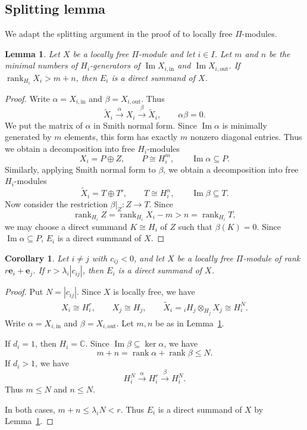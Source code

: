 \documentclass[12pt,reqno]{amsart}
\numberwithin{equation}{section}
\newtheorem{lemma}[theorem]{Lemma}
\newtheorem{corollary}[theorem]{Corollary}
\theoremstyle{definition}
\theoremstyle{remark}
\renewcommand{\Im}{\operatorname{Im}}
\newcommand{\rank}{\operatorname{rank}}
\theoremstyle{plain}
\theoremstyle{plain}
\begin{document}
\subsection{Splitting lemma}\label{subsec:splitting}
We adapt the splitting argument in the proof of \cite[Lemma~6.3]{GLS18} to locally free $\Pi$-modules.
\begin{lemma}\label{lem:general splitting}
   Let $X$ be a locally free $\Pi$-module and let $i\in I$. Let $m$ and $n$ be the minimal numbers of $H_i$-generators of $\Im X_{i,\mathrm{in}}$ and $\Im X_{i,\mathrm{out}}$. If $\rank_{H_i}X_i>m+n$, then $E_i$ is a direct summand of $X$.
\end{lemma}

\begin{proof}
    Write $\alpha=X_{i,\mathrm{in}}$ and $\beta=X_{i,\mathrm{out}}$. Thus
\[
    \widetilde X_i \xrightarrow{\alpha} X_i
    \xrightarrow{\beta} \widetilde X_i,
    \qquad \alpha\beta=0.
\]
We put the matrix of $\alpha$ in Smith normal form. Since $\Im \alpha$ is minimally generated by $m$ elements, this form has exactly $m$ nonzero diagonal entries. Thus we obtain a decomposition into free $H_i$-modules
\[
    X_i=P\oplus Z,\qquad
    P\cong H_i^m,\qquad
    \Im \alpha\subseteq P.
\]
Similarly, applying Smith normal form to $\beta$, we obtain a decomposition into free $H_i$-modules
\[
    \widetilde X_i=T\oplus T',\qquad
    T\cong H_i^n,\qquad
    \Im \beta\subseteq T.
\]
Now consider the restriction $\beta|_Z:Z\to T$. Since
\[
    \rank_{H_i}Z
    =\rank_{H_i}X_i-m>n=\rank_{H_i}T,
\]
we may choose a direct summand $K\cong H_i$ of $Z$ such that $\beta(K)=0$. Since $\Im \alpha\subseteq P$, $E_i$ is a direct summand of $X$.
\end{proof}

\begin{corollary}\label{lem:splitting}
Let $i\ne j$ with $c_{ij}<0$, and let $X$ be a locally free $\Pi$-module of rank $r\mathbf e_i+\mathbf e_j$. If $r>\lambda_i|c_{ij}|$, then $E_i$ is a direct summand of $X$.
\end{corollary}

\begin{proof}
    Put $N=|c_{ij}|$. Since $X$ is locally free, we have
\begin{align*}
    X_i\cong H_{i}^r,\qquad X_j\cong H_j,\qquad
    \widetilde X_i
    ={}_iH_j\otimes_{H_j}X_j\cong H_i^N.
\end{align*}
Write $\alpha=X_{i,\mathrm{in}}$ and $\beta=X_{i,\mathrm{out}}$. Let $m,n$ be as in Lemma~\ref{lem:general splitting}.

If $d_i=1$, then $H_i=\mathbb C$. Since
$\operatorname{Im}\beta\subseteq\ker\alpha$, we have
\[
    m+n
    =\operatorname{rank}\alpha+\operatorname{rank}\beta
    \leq N.
\]
If $d_i>1$, we have
\[
    H_i^N \xrightarrow{\alpha} H_i^r \xrightarrow{\beta} H_i^N.
\]
Thus $m \leq N$ and $n \leq N$.

In both cases, $m+n\leq\lambda_i N<r$. Thus $E_i$ is a direct summand of $X$ by Lemma~\ref{lem:general splitting}.
\end{proof}
\end{document}
